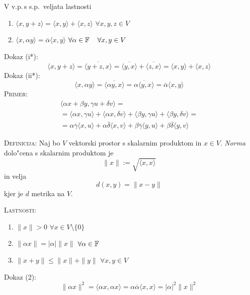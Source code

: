 %
V v.p.\,s s.p.\, veljata lastnosti
\begin{enumerate}[(i*)]
    \item $\langle x, y + z \rangle = \langle x, y \rangle + \langle x, z \rangle$ \hfill $\forall x, y, z \in V$
    \item $\langle x, \alpha y \rangle = \overline{\alpha} \langle x, y \rangle$ \hfill $\forall \alpha \in \operatorname{\mathbb{F}} \quad \forall x, y \in V$
\end{enumerate}
Dokaz (i*):
\begin{equation*}
\langle x, y + z \rangle = \overline{\langle y + z, x \rangle} = \overline{\langle y, x \rangle} + \overline{\langle z, x \rangle} = \langle x, y \rangle + \langle x, z \rangle
\end{equation*}
Dokaz (ii*):
\begin{equation*}
\langle x, \alpha y \rangle = \overline{\langle \alpha y, x \rangle} = \overline{\alpha \langle y, x \rangle} = \overline{\alpha} \langle x, y \rangle
\end{equation*}
\textsc{Primer:}
\begin{multline*}
\langle \alpha x + \beta y, \gamma u + \delta v \rangle = \\
= \langle\alpha x, \gamma u \rangle + \langle \alpha x, \delta v \rangle + \langle \beta y, \gamma u \rangle + \langle \beta y, \delta v \rangle = \\
= \alpha \overline{\gamma} \langle x, u \rangle + \alpha \overline{\delta} \langle x, v \rangle + \beta \overline{\gamma} \langle y, u \rangle + \beta \overline{\delta} \langle y, v \rangle
\end{multline*}

\textsc{Definicija:} Naj bo $V$ vektorski prostor s skalarnim produktom in $x \in V$. \emph{Norma} dolo"cena s skalarnim produktom je
\begin{equation*}
\| x \| := \sqrt{\langle x, x \rangle}
\end{equation*}
in velja 
\begin{equation*}
d(x, y) = \| x - y \|
\end{equation*}
kjer je $d$ metrika na $V$.

\textsc{Lastnosti:}
\begin{enumerate}[(1)]
    \item $\| x \| > 0$ \hfill $\forall x \in V \setminus \{ 0 \}$
    \item $\| \alpha x \| = |\alpha| \| x \|$ \hfill $\forall \alpha \in \operatorname{\mathbb{F}}$
    \item $\| x + y \| \leq \|x \| + \| y \|$ \hfill $\forall x, y \in V$
\end{enumerate}
Dokaz (2):
\begin{equation*}
\| \alpha x \|^2 = \langle \alpha x , \alpha x \rangle  = \alpha \overline{\alpha} \langle x, x \rangle = |\alpha|^2 \| x \|^2
\end{equation*}

